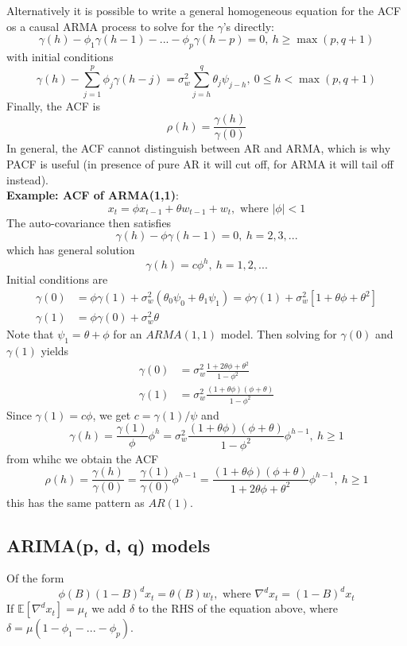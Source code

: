 \documentclass[11pt]{article}
\newcommand{\noi}{\noindent}
\begin{document}
\noi Alternatively it is possible to write a general homogeneous equation for the ACF os a causal ARMA process to solve for the $\gamma$'s directly:
$$\gamma(h) - \phi_1\gamma(h-1) - ... - \phi_p\gamma(h-p) = 0, \: h \geq \max(p, q+1)$$
\noi with initial conditions
$$\gamma(h) - \sum_{j=1}^{p}{\phi_j\gamma(h-j)} = \sigma_w^2\sum_{j=h}^{q}\theta_j\psi_{j-h}, \: 0 \leq h < \max(p, q+1)$$
\noi Finally, the ACF is
$$\rho(h) = \frac{\gamma(h)}{\gamma(0)}$$
\noi In general, the ACF cannot distinguish between AR and ARMA, which is why PACF is useful (in presence of pure AR it will cut off, for ARMA it will tail off instead). \\

\noi \textbf{Example: ACF of ARMA(1,1)}:
$$x_t = \phi x_{t-1} + \theta w_{t-1} + w_t, \text{ where } |\phi| < 1$$
\noi The auto-covariance then satisfies
$$\gamma(h) - \phi \gamma(h-1) = 0, \: h=2,3,...$$
\noi which has general solution
$$\gamma(h) = c\phi^h, \: h=1,2,...$$
\noi Initial conditions are 
\begin{align*}
    \gamma(0) &= \phi \gamma(1) + \sigma_w^2(\theta_0\psi_0 + \theta_1\psi_1) = \phi\gamma(1) + \sigma_w^2[1 + \theta\phi + \theta^2] \\
    \gamma(1) &= \phi\gamma(0) + \sigma_w^2\theta
\end{align*}
\noi Note that $\psi_1 = \theta + \phi$ for an $ARMA(1,1)$ model. Then solving for $\gamma(0)$ and $\gamma(1)$ yields
\begin{align*}
    \gamma(0) &= \sigma_w^2\frac{1+2\theta\phi + \theta^2}{1-\phi^2} \\
    \gamma(1) &= \sigma_w^2\frac{(1+\theta\phi)(\phi + \theta)}{1 - \phi^2}
\end{align*}
\noi Since $\gamma(1) = c\phi$, we get $c = \gamma(1)/\psi$ and
$$\gamma(h) = \frac{\gamma(1)}{\phi}\phi^h = \sigma_w^2\frac{(1 + \theta\phi)(\phi + \theta)}{1-\phi^2}\phi^{h-1}, \: h \geq 1$$
\noi from whihc we obtain the ACF
$$\rho(h) = \frac{\gamma(h)}{\gamma(0)} = \frac{\gamma(1)}{\gamma(0)}\phi^{h-1} = \frac{(1+\theta\phi)(\phi + \theta)}{1 + 2\theta\phi + \theta^2}\phi^{h-1}, \: h \geq 1$$
\noi this has the same pattern as $AR(1)$.

\subsection{ARIMA(p, d, q) models}
\noi Of the form
$$\phi(B)(1-B)^dx_t = \theta(B)w_t, \text{ where } \nabla^dx_t = (1-B)^d x_t$$
\noi If $\mathbb{E}[\nabla^d x_t] = \mu_t$ we add $\delta$ to the RHS of the equation above, where $\delta = \mu(1 - \phi_1 - ... - \phi_p)$.
\end{document}
